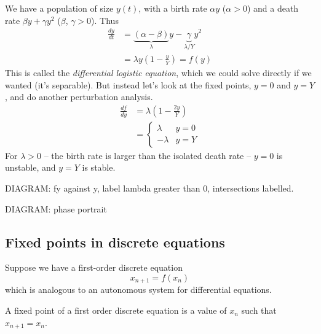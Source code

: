\documentclass{../template/note}
\begin{document}
    \begin{example}
        We have a population of size \(y(t)\), with a birth rate \(\alpha y\) (\(\alpha > 0\)) and a death rate \(\beta y + \gamma y^2\) (\(\beta\), \(\gamma > 0\)). Thus
        \begin{align*}
            \frac{dy}{dt} &= \underbrace{(\alpha - \beta)}_\lambda y - \underbrace{\gamma}_{\lambda/Y} y^2 \\
            &= \lambda y \left(1 - \frac{y}{Y}\right) = f(y)
        \end{align*}
        This is called the \emph{differential logistic equation}, which we could solve directly if we wanted (it's separable). But instead let's look at the fixed points, \(y = 0\) and \(y = Y\), and do another perturbation analysis.
        \begin{align*}
            \frac{df}{dy} &= \lambda\left(1-\frac{2y}{Y}\right) \\
            &= \begin{cases}
                \lambda & y = 0 \\
                -\lambda & y = Y
            \end{cases}
        \end{align*}
        For \(\lambda > 0\) -- the birth rate is larger than the isolated death rate -- \(y=0\) is unstable, and \(y = Y\) is stable. 

        DIAGRAM: fy against y, label lambda greater than 0, intersections labelled.

        DIAGRAM: phase portrait
        
        
    \end{example}
    
    \subsection{Fixed points in discrete equations}

    Suppose we have a first-order discrete equation
    \[
        x_{n+1} = f(x_n)
    \]
    which is analogous to an autonomous system for differential equations.

    \begin{definition}
        A fixed point of a first order discrete equation is a value of \(x_n\) such that \(x_{n+1} = x_n\).
    \end{definition}
    
\end{document}
